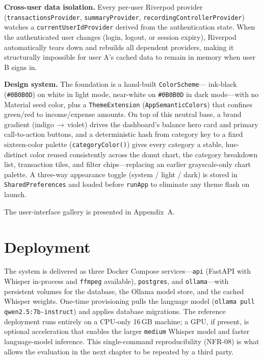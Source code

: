 \textbf{Cross-user data isolation.} Every per-user Riverpod provider
(\texttt{transactionsProvider}, \texttt{summaryProvider},
\texttt{recordingControllerProvider}) watches a \texttt{currentUserIdProvider}
derived from the authentication state. When the authenticated user changes
(login, logout, or session expiry), Riverpod automatically tears down and
rebuilds all dependent providers, making it structurally impossible for user
A's cached data to remain in memory when user B signs in.

\textbf{Design system.} The foundation is a hand-built \texttt{ColorScheme}---
ink-black (\texttt{\#0B0B0D}) on white in light mode, near-white on
\texttt{\#0B0B0D} in dark mode---with no Material seed color, plus a
\texttt{ThemeExtension} (\texttt{AppSemanticColors}) that confines green/red to
income/expense amounts. On top of this neutral base, a brand gradient
(indigo\,$\rightarrow$\,violet) drives the dashboard's balance hero card and
primary call-to-action buttons, and a deterministic hash from category key to
a fixed sixteen-color palette (\texttt{categoryColor()}) gives every category
a stable, hue-distinct color reused consistently across the donut chart, the
category breakdown list, transaction tiles, and filter chips---replacing an
earlier grayscale-only chart palette. A three-way appearance toggle (system /
light / dark) is stored in \texttt{SharedPreferences} and loaded before
\texttt{runApp} to eliminate any theme flash on launch.

The user-interface gallery is presented in Appendix~A.

\section{Deployment}

The system is delivered as three Docker Compose services---\texttt{api} (FastAPI
with Whisper in-process and \texttt{ffmpeg} available), \texttt{postgres}, and
\texttt{ollama}---with persistent volumes for the database, the Ollama model
store, and the cached Whisper weights. One-time provisioning pulls the language
model (\texttt{ollama pull qwen2.5:7b-instruct}) and applies database migrations.
The reference deployment runs entirely on a CPU-only 16\,GB machine; a GPU, if
present, is optional acceleration that enables the larger \texttt{medium} Whisper
model and faster language-model inference. This single-command reproducibility
(NFR-08) is what allows the evaluation in the next chapter to be repeated by a
third party.

